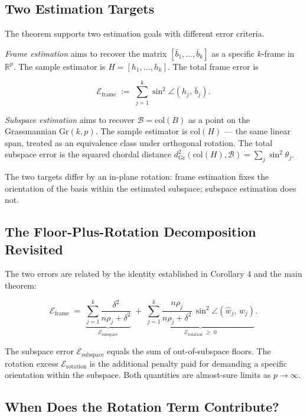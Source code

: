 \documentclass{article}
\theoremstyle{remark}
\begin{document}
\subsection{Two Estimation Targets}

The theorem supports two estimation goals with different error criteria.

\textit{Frame estimation} aims to recover the matrix $[\bar{b}_1, \ldots, \bar{b}_k]$ as a specific $k$-frame in $\mathbb{R}^p$. The sample estimator is $H = [h_1, \ldots, h_k]$. The total frame error is

\[
\mathcal{E}_{\mathrm{frame}} \;:=\; \sum_{j=1}^k \sin^2\angle(h_j,\, \bar{b}_j).
\]

\textit{Subspace estimation} aims to recover $\mathcal{B} = \mathrm{col}(B)$ as a point on the Grassmannian $\mathrm{Gr}(k,p)$. The sample estimator is $\mathrm{col}(H)$ — the same linear span, treated as an equivalence class under orthogonal rotation. The total subspace error is the squared chordal distance $d_{\mathrm{Gr}}^2(\mathrm{col}(H), \mathcal{B}) = \sum_j \sin^2\theta_j$.

The two targets differ by an in-plane rotation: frame estimation fixes the orientation of the basis within the estimated subspace; subspace estimation does not.

\subsection{The Floor-Plus-Rotation Decomposition Revisited}

The two errors are related by the identity established in Corollary 4 and the main theorem:

\[
\mathcal{E}_{\mathrm{frame}} \;=\; \underbrace{\sum_{j=1}^k \frac{\delta^2}{n\rho_j + \delta^2}}_{\mathcal{E}_{\mathrm{subspace}}} \;+\; \underbrace{\sum_{j=1}^k \frac{n\rho_j}{n\rho_j + \delta^2}\,\sin^2\angle(\hat{w}_j,\, w_j)}_{\mathcal{E}_{\mathrm{rotation}} \;\ge\; 0}.
\]

The subspace error $\mathcal{E}_{\mathrm{subspace}}$ equals the sum of out-of-subspace floors. The rotation excess $\mathcal{E}_{\mathrm{rotation}}$ is the additional penalty paid for demanding a specific orientation within the subspace. Both quantities are almost-sure limits as $p \to \infty$.

\subsection{When Does the Rotation Term Contribute?}
\end{document}
